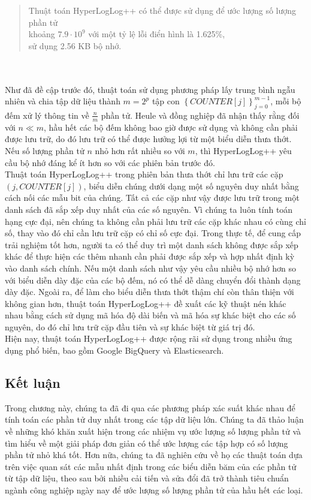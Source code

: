 \documentclass[letterpaper,13pt]{article}
\theoremstyle{mytheor}
\begin{document}
\begin{quote}
    Thuật toán HyperLogLog++ có thể được sử dụng để ước lượng số lượng phần tử \\
    khoảng $7.9 \cdot 10^9$ với một tỷ lệ lỗi điển hình là 1.625\%, \\
    sử dụng 2.56 KB bộ nhớ.
    \vspace{0.25cm}
\end{quote}
\\\\
\indent Như đã đề cập trước đó, thuật toán sử dụng phương pháp lấy trung bình ngẫu nhiên và chia tập dữ liệu thành $m = 2^p$ tập con $\left\{COUNTER[j]\right\}_{j=0}^{m-1}$, 
mỗi bộ đếm xử lý thông tin về $\frac{n}{m}$ phần tử. Heule và đồng nghiệp đã nhận thấy rằng đối với $n \ll m$, hầu hết các bộ đếm không bao giờ được 
sử dụng và không cần phải được lưu trữ, do đó lưu trữ có thể được hưởng lợi từ một biểu diễn thưa thớt. Nếu số lượng phần tử $n$ nhỏ hơn rất nhiều 
so với $m$, thì HyperLogLog++ yêu cầu bộ nhớ đáng kể ít hơn so với các phiên bản trước đó.\\
\indent Thuật toán HyperLogLog++ trong phiên bản thưa thớt chỉ lưu trữ các cặp $(j, COUNTER[j])$, biểu diễn chúng dưới dạng một số nguyên duy nhất 
bằng cách nối các mẫu bit của chúng. Tất cả các cặp như vậy được lưu trữ trong một danh sách đã sắp xếp duy nhất của các số nguyên. 
Vì chúng ta luôn tính toán hạng cực đại, nên chúng ta không cần phải lưu trữ các cặp khác nhau có cùng chỉ số, thay vào đó chỉ cần lưu trữ cặp 
có chỉ số cực đại.
Trong thực tế, để cung cấp trải nghiệm tốt hơn, người ta có thể duy trì một danh sách không được sắp xếp khác để thực hiện các thêm nhanh 
cần phải được sắp xếp và hợp nhất định kỳ vào danh sách chính. Nếu một danh sách như vậy yêu cầu nhiều bộ nhớ hơn so với biểu diễn dày đặc 
của các bộ đếm, nó có thể dễ dàng chuyển đổi thành dạng dày đặc. Ngoài ra, để làm cho biểu diễn thưa thớt thậm chí còn thân thiện với không gian hơn, 
thuật toán HyperLogLog++ đề xuất các kỹ thuật nén khác nhau bằng cách sử dụng mã hóa độ dài biến và mã hóa sự khác biệt cho các số nguyên, 
do đó chỉ lưu trữ cặp đầu tiên và sự khác biệt từ giá trị đó.\\
\indent Hiện nay, thuật toán HyperLogLog++ được rộng rãi sử dụng trong nhiều ứng dụng phổ biến, bao gồm Google BigQuery và Elasticsearch.
\subsection*{Kết luận}
Trong chương này, chúng ta đã đi qua các phương pháp xác suất khác nhau để tính toán các phần tử duy nhất trong các tập dữ liệu lớn. 
Chúng ta đã thảo luận về những khó khăn xuất hiện trong các nhiệm vụ ước lượng số lượng phần tử và tìm hiểu về một giải pháp đơn giản có thể ước lượng 
các tập hợp có số lượng phần tử nhỏ khá tốt. Hơn nữa, chúng ta đã nghiên cứu về họ các thuật toán dựa trên việc quan sát các mẫu nhất định trong 
các biểu diễn băm của các phần tử từ tập dữ liệu, theo sau bởi nhiều cải tiến và sửa đổi đã trở thành tiêu chuẩn ngành công nghiệp ngày nay để 
ước lượng số lượng phần tử của hầu hết các loại.\\
\newpage
\end{document}
